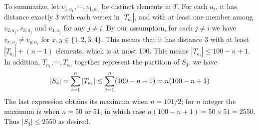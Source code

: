 \documentclass[11pt,a4paper]{article}
\begin{document}
\begin{enumerate}
	To summarize, let $v_{1, a_1}, \cdots , v_{1, a_n}$ be distinct elements in $T$. For each $a_i$, it has distance exactly 3 with each vertex in $|T_{a_i}|$, and with at least one member among $v_{2, a_j}, v_{3, a_j}$ and $v_{4, a_j}$ for any $j\neq i$. By our assumption, for each $j\neq i$ we have $v_{x, a_j}\neq v_{y, a_i}$ for $x, y\in \{1, 2, 3, 4\}$. This means that it has distance 3 with at least $|T_{a_i}|+(n-1)$ elements, which is at most 100. This means $|T_{a_i}|\le 100-n+1$. In addition, $T_{a_1}, \cdots , T_{a_n}$ together represent the partition of $S_4$, we have 
	\[
	|S_4|=\displaystyle\sum_{i=1}^n |T_{a_i}|\le \displaystyle\sum_{i=1}^n (100-n+1) = n(100-n+1)
	\]
	The last expression obtains its maximum when $n=101/2$; for $n$ integer the maximum is when $n=50$ or $51$, in which case $n(100-n+1)=50\times 51 = 2550$. Thus $|S_4|\le 2550$ as desired. 
	
\end{enumerate}
\end{document}
